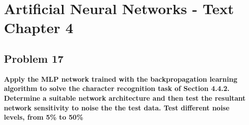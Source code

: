 
\chapter{Artificial Neural Networks - Text Chapter 4}

\section{Problem 17}

\textbf{Apply the MLP network trained with the backpropagation learning algorithm to solve the character recognition task of Section 4.4.2.} \newline \\
\textbf{Determine a suitable network architecture and then test the resultant network sensitivity to noise the the test data. Test different noise levels, from 5\% to 50\%}


